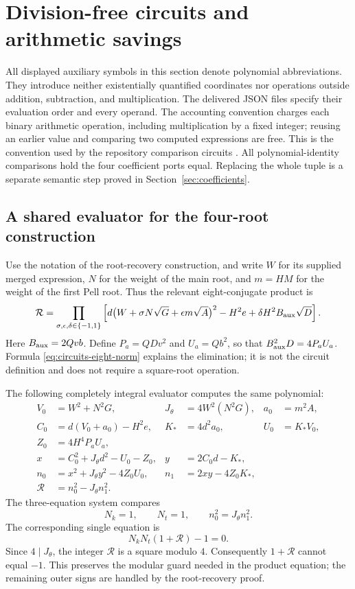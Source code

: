 \documentclass[11pt,letterpaper]{article}
\theoremstyle{remark}
\begin{document}
\section{Division-free circuits and arithmetic savings}
\label{sec:circuits}

All displayed auxiliary symbols in this section denote polynomial
abbreviations. They introduce neither existentially quantified coordinates
nor operations outside addition, subtraction, and multiplication.
The delivered JSON files specify their evaluation order and every operand.
The accounting convention charges each binary arithmetic operation, including
multiplication by a fixed integer; reusing an earlier value and comparing two
computed expressions are free. This is the convention used by the repository
comparison circuits \cite{repo21,repo22}.
All polynomial-identity comparisons hold the four coefficient ports equal.
Replacing the whole tuple is a separate semantic step proved in
Section~\ref{sec:coefficients}.

\subsection{A shared evaluator for the four-root construction}

Use the notation of the root-recovery construction, and write $W$ for its
supplied merged expression, $N$ for the weight of the main root, and $m=HM$
for the weight of the first Pell root. Thus the relevant eight-conjugate
product is
\begin{equation}
\mathcal R=
\prod_{\sigma,\epsilon,\delta\in\{-1,1\}}
\left[d\bigl(W+\sigma N\sqrt G+\epsilon m\sqrt A\bigr)^2
      -H^2e+\delta H^2B_{\rm aux}\sqrt D\right].
\label{eq:circuits-eight-norm}
\end{equation}
Here $B_{\rm aux}=2Qvb$. Define $P_a=QDv^2$ and $U_a=Qb^2$,
so that $B_{\rm aux}^2D=4P_aU_a$. Formula \eqref{eq:circuits-eight-norm} explains the elimination;
it is not the circuit definition and does not require a square-root operation.

The following completely integral evaluator computes the same polynomial:
\begin{align*}
 V_0&=W^2+N^2G,& J_\theta&=4W^2(N^2G),& a_0&=m^2A,\\
 C_0&=d(V_0+a_0)-H^2e,& K_*&=4d^2a_0,& U_0&=K_*V_0,\\
 Z_0&=4H^4P_aU_a,\\
 x&=C_0^2+J_\theta d^2-U_0-Z_0,
 &y&=2C_0d-K_*,\\
 n_0&=x^2+J_\theta y^2-4Z_0U_0,
 &n_1&=2xy-4Z_0K_*,\\
 \mathcal R&=n_0^2-J_\theta n_1^2.
\end{align*}
The three-equation system compares
\[
 N_k=1,\qquad N_t=1,\qquad n_0^2=J_\theta n_1^2.
\]
The corresponding single equation is
\[
 N_kN_t(1+\mathcal R)-1=0.
\]
Since $4\mid J_\theta$, the integer $\mathcal R$ is a square modulo $4$.
Consequently $1+\mathcal R$ cannot equal $-1$. This preserves the modular
guard needed in the product equation; the remaining outer signs are handled
by the root-recovery proof.
\end{document}

